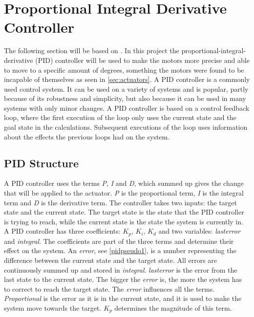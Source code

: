 \section{Proportional Integral Derivative Controller}\label{design:PID}
The following section will be based on \cite{PIDcontrolsystem}. In this project the proportional-integral-derivative (PID) controller will be used to make the motors more precise and able to move to a specific amount of degrees, something the motors were found to be incapable of themselves as seen in \cref{sec:actuators}. A PID controller is a commonly used control system. It can be used on a variety of systems and is popular, partly because of its robustness and simplicity, but also because it can be used in many systems with only minor changes. A PID controller is based on a control feedback loop, where the first execution of the loop only uses the current state and the goal state in the calculations. Subsequent executions of the loop uses information about the effects the previous loops had on the system.

\subsection{PID Structure}
A PID controller uses the terms \emph{P}, \emph{I} and \emph{D}, which summed up gives the change that will be applied to the actuator. \emph{P} is the proportional term, \emph{I} is the integral term and \emph{D} is the derivative term. The controller takes two inputs: the target state and the current state. The target state is the state that the PID controller is trying to reach, while the current state is the state the system is currently in. A PID controller has three coefficients: $K_p$, $K_i$, $K_d$ and two variables: \emph{lasterror} and \emph{integral}. The coefficients are part of the three terms and determine their effect on the system. An \emph{error}, see \cref{pidpseudo1}, is a number representing the difference between the current state and the target state. All errors are continuously summed up and stored in \emph{integral}. \emph{lasterror} is the error from the last state to the current state. The bigger the \emph{error} is, the more the system has to correct to reach the target state. The \emph{error} influences all the terms. \\

\emph{Proportional} is the error as it is in the current state, and it is used to make the system move towards the target. $K_p$ determines the magnitude of this term. \\

